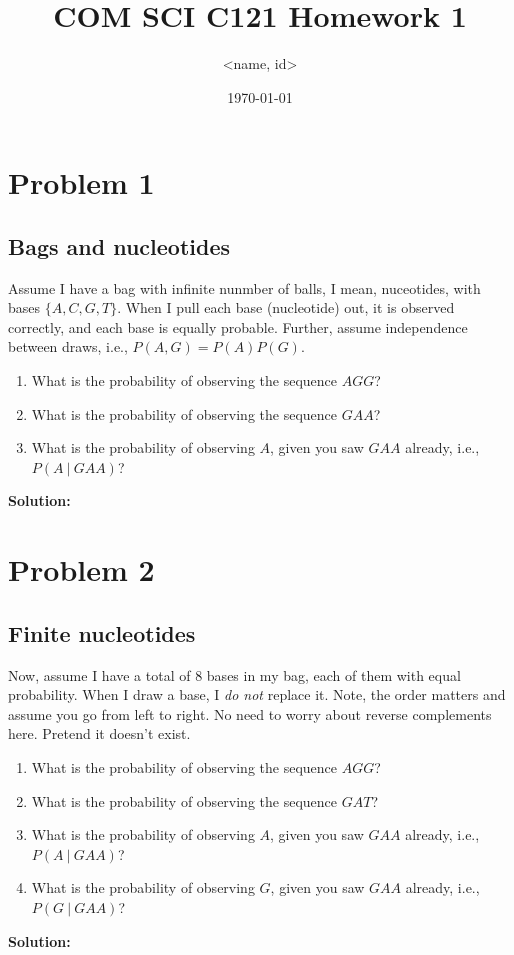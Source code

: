 \documentclass[10pt]{article}
\title{COM SCI C121 Homework 1}
\author{<name, id>}
\date{\today}
\newcommand{\solution}{\textbf{Solution:}}
\begin{document}
\maketitle

\section*{Problem 1}
\subsection*{Bags and nucleotides}
Assume I have a bag with infinite nunmber of balls, I mean, nuceotides, with bases $\{A, C, G, T\}$.  When I pull each base (nucleotide) out, it is observed correctly, and each base is equally probable.  Further, assume independence between draws, i.e., $P(A, G) = P(A)P(G)$.
\begin{enumerate}[~~(a)]
    \item What is the probability of observing the sequence $AGG$?
    \item What is the probability of observing the sequence $GAA$?
    \item What is the probability of observing $A$, given you saw $GAA$ already, i.e., $P(A \:\vert\: GAA)$?
\end{enumerate}
\solution\\

\section*{Problem 2}
\subsection*{Finite nucleotides}
Now, assume I have a total of 8 bases in my bag, each of them with equal probability.  When I draw a base, I \textit{do not} replace it.  Note, the order matters and assume you go from left to right.  No need to worry about reverse complements here.  Pretend it doesn't exist.
\begin{enumerate}[~~(a)]
    \item What is the probability of observing the sequence $AGG$?
    \item What is the probability of observing the sequence $GAT$?
    \item What is the probability of observing $A$, given you saw $GAA$ already, i.e., $P(A \:\vert\: GAA)$?
    \item What is the probability of observing $G$, given you saw $GAA$ already, i.e., $P(G \:\vert\: GAA)$?
\end{enumerate}
\solution\\
\end{document}
